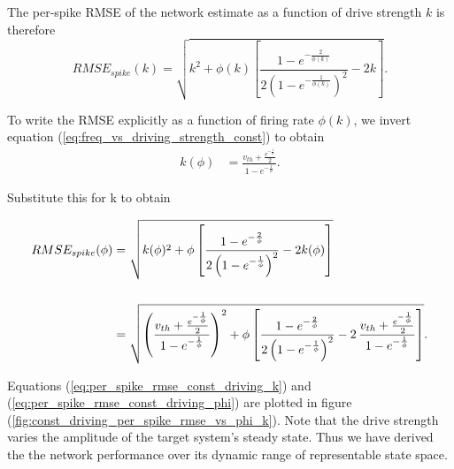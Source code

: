 \begin{enumerate}
The per-spike RMSE of the network estimate as a function of drive strength $k$ is therefore
\begin{equation}
\label{eq:per_spike_rmse_const_driving_k}
RMSE_{spike}(k) =
\sqrt{k^2  + \phi(k) \left[ \frac{1 - e^{-\frac{2}{\phi(k)}}}{2 \left(1 - e^{-\frac{1}{\phi(k)}} \right)^2}  -2 k \right] }.
\end{equation}

To write the RMSE explicitly as a function of firing rate $\phi(k)$, we invert equation (\ref{eq:freq_vs_driving_strength_const}) to obtain
\begin{align*}
k(\phi)&=  \frac{ v_{th} + \frac{e^{-\frac{1}{\phi}}}{2}}{1 - e^{-\frac{1}{\phi}}}.
\end{align*}

Substitute this for k to obtain

\begin{align}
\label{eq:per_spike_rmse_const_driving_phi}
RMSE_{spike}(\phi) &=
\sqrt{k(\phi)^2  + \phi \left[ \frac{1 - e^{-\frac{2}{\phi}}}{2 \left(1 - e^{-\frac{1}{\phi}} \right)^2}  -2 k(\phi) \right] } \notag
%
\\ 
\\
%
&= 
\sqrt{
     \left(
		     \frac
			{
			v_{th} + \frac{e^{- \frac{1}{\phi}      }}{2}
			}
			{
			1 - e^{-\frac{1}{\phi}   }
			}
      \right)^2
  +
   \phi \left[ \frac{1 - e^{-\frac{2}{\phi}}}{2 \left(1 - e^{-\frac{1}{\phi}} \right)^2}  
   -2 \, 
			    \frac
			{
			v_{th} + \frac{e^{-\frac{1}{\phi}   }}{2}
			}
			{
			1 - e^{-\frac{1}{\phi}   }
			}
     \right]
     } \notag.
\end{align}

Equations (\ref{eq:per_spike_rmse_const_driving_k}) and (\ref{eq:per_spike_rmse_const_driving_phi}) are plotted in figure (\ref{fig:const_driving_per_spike_rmse_vs_phi_k}). Note that the drive strength varies the amplitude of the target system's steady state. Thus we have derived the the network performance over its dynamic range of representable state space. 




\end{enumerate}
